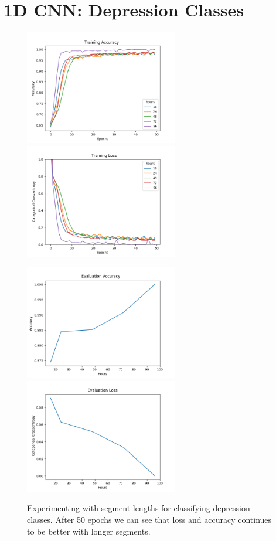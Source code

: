 \section{1D CNN: Depression Classes}

\begin{figure}[h]
      \begin{multicols}{2}
            \includegraphics[height=5cm]{img/depression_class/plot_acc_train.png}
            \includegraphics[height=5cm]{img/depression_class/plot_loss_train.png}

            \includegraphics[height=5cm]{img/depression_class/plot_acc_eval.png}
            \includegraphics[height=5cm]{img/depression_class/plot_loss_eval.png}
      \end{multicols}
      \caption{Experimenting with segment lengths for classifying depression classes. After 50 epochs we can see that loss and accuracy continues to be better with longer segments.}
      \label{figure:depression_class_50e}
\end{figure}


